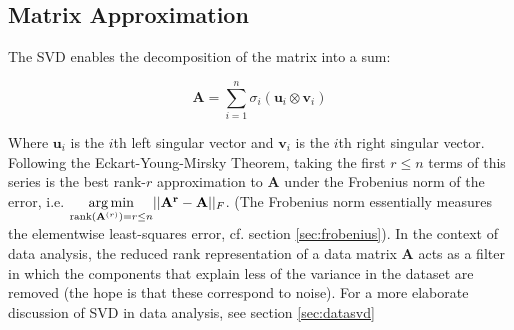 \subsection{Matrix Approximation}
The SVD enables the decomposition of the matrix into a sum:

\begin{equation}
\mathbf{A} = \sum_{i=1}^n \sigma_i (\mathbf{u}_i \otimes \mathbf{v}_i)
\end{equation}

Where $\mathbf{u}_i$ is the $i$th left singular vector and $\mathbf{v}_i$ is the $i$th right singular vector. Following the Eckart-Young-Mirsky Theorem, taking the first $r \leq n$ terms of this series is the best rank-$r$ approximation to $\mathbf{A}$ under the Frobenius norm of the error, i.e.  $\underset{\mathrm{rank}(\mathbf{A}^{(r)})=r\leq n}{\operatorname*{arg\,min}} ||\mathbf{A^r}-\mathbf{A}||_F$. (The Frobenius norm essentially measures the elementwise least-squares error, cf. section \ref{sec:frobenius}). In the context of data analysis, the reduced rank representation of a data matrix $\mathbf{A}$ acts as a filter in which the components that explain less of the variance in the dataset are removed (the hope is that these correspond to noise). For a more elaborate discussion of SVD in data analysis, see section \ref{sec:datasvd}